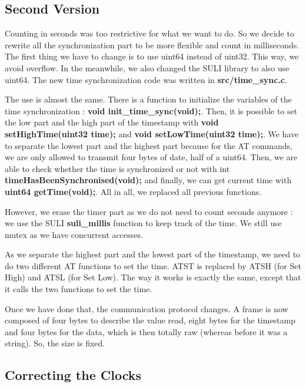 \subsection{Second Version}

Counting in seconds was too restrictive for what we want to do. So we decide to rewrite all the synchronization part to be more flexible and count in milliseconds. The first thing we have to change is to use uint64 instead of uint32. This way, we avoid overflow. In the meanwhile, we also changed the SULI library to also use uint64. The new time synchronization code was written in \textbf{src/time\_sync.c}.

The use is almost the same. There is a function to initialize the variables of the time synchronization : \textbf{void init\_time\_sync(void);}. Then, it is possible to set the low part and the high part of the timestamp with \textbf{void setHighTime(uint32 time);} and \textbf{void setLowTime(uint32 time);}. We have to separate the lowest part and the highest part because for the AT commands, we are only allowed to transmit four bytes of date, half of a uint64. Then, we are able to check whether the time is synchronized or not with int \textbf{timeHasBeenSynchronised(void);} and finally, we can get current time with \textbf{uint64 getTime(void);}. All in all, we replaced all previous functions.

However, we erase the timer part as we do not need to count seconds anymore : we use the SULI \textbf{suli\_millis} function to keep track of the time. We still use mutex as we have concurrent accesses.

As we separate the highest part and the lowest part of the timestamp, we need to do two different AT functions to set the time. ATST is replaced by ATSH (for Set High) and ATSL (for Set Low). The way it works is exactly the same, except that it calls the two functions to set the time.

Once we have done that, the communication protocol changes. A frame is now composed of four bytes to describe the value read, eight bytes for the timestamp and four bytes for the data, which is then totally raw (whereas before it was a string). So, the size is fixed.

\subsection{Correcting the Clocks}

